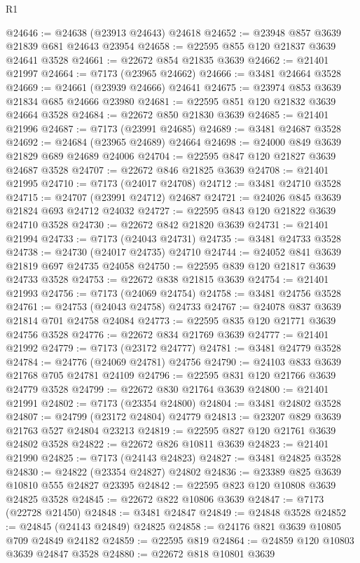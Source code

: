 \begin{lexlean}{R1}
\begin{coremodule}
@24646 := @24638 (@23913 @24643) @24618
@24652 := @23948 @857 @3639 @21839 @681 @24643 @23954
@24658 := @22595 @855 @120 @21837 @3639 @24641 @3528
@24661 := @22672 @854 @21835 @3639
@24662 := @21401 @21997
@24664 := @7173 (@23965 @24662)
@24666 := @3481 @24664 @3528
@24669 := @24661 (@23939 @24666) @24641
@24675 := @23974 @853 @3639 @21834 @685 @24666 @23980
@24681 := @22595 @851 @120 @21832 @3639 @24664 @3528
@24684 := @22672 @850 @21830 @3639
@24685 := @21401 @21996
@24687 := @7173 (@23991 @24685)
@24689 := @3481 @24687 @3528
@24692 := @24684 (@23965 @24689) @24664
@24698 := @24000 @849 @3639 @21829 @689 @24689 @24006
@24704 := @22595 @847 @120 @21827 @3639 @24687 @3528
@24707 := @22672 @846 @21825 @3639
@24708 := @21401 @21995
@24710 := @7173 (@24017 @24708)
@24712 := @3481 @24710 @3528
@24715 := @24707 (@23991 @24712) @24687
@24721 := @24026 @845 @3639 @21824 @693 @24712 @24032
@24727 := @22595 @843 @120 @21822 @3639 @24710 @3528
@24730 := @22672 @842 @21820 @3639
@24731 := @21401 @21994
@24733 := @7173 (@24043 @24731)
@24735 := @3481 @24733 @3528
@24738 := @24730 (@24017 @24735) @24710
@24744 := @24052 @841 @3639 @21819 @697 @24735 @24058
@24750 := @22595 @839 @120 @21817 @3639 @24733 @3528
@24753 := @22672 @838 @21815 @3639
@24754 := @21401 @21993
@24756 := @7173 (@24069 @24754)
@24758 := @3481 @24756 @3528
@24761 := @24753 (@24043 @24758) @24733
@24767 := @24078 @837 @3639 @21814 @701 @24758 @24084
@24773 := @22595 @835 @120 @21771 @3639 @24756 @3528
@24776 := @22672 @834 @21769 @3639
@24777 := @21401 @21992
@24779 := @7173 (@23172 @24777)
@24781 := @3481 @24779 @3528
@24784 := @24776 (@24069 @24781) @24756
@24790 := @24103 @833 @3639 @21768 @705 @24781 @24109
@24796 := @22595 @831 @120 @21766 @3639 @24779 @3528
@24799 := @22672 @830 @21764 @3639
@24800 := @21401 @21991
@24802 := @7173 (@23354 @24800)
@24804 := @3481 @24802 @3528
@24807 := @24799 (@23172 @24804) @24779
@24813 := @23207 @829 @3639 @21763 @527 @24804 @23213
@24819 := @22595 @827 @120 @21761 @3639 @24802 @3528
@24822 := @22672 @826 @10811 @3639
@24823 := @21401 @21990
@24825 := @7173 (@24143 @24823)
@24827 := @3481 @24825 @3528
@24830 := @24822 (@23354 @24827) @24802
@24836 := @23389 @825 @3639 @10810 @555 @24827 @23395
@24842 := @22595 @823 @120 @10808 @3639 @24825 @3528
@24845 := @22672 @822 @10806 @3639
@24847 := @7173 (@22728 @21450)
@24848 := @3481 @24847
@24849 := @24848 @3528
@24852 := @24845 (@24143 @24849) @24825
@24858 := @24176 @821 @3639 @10805 @709 @24849 @24182
@24859 := @22595 @819
@24864 := @24859 @120 @10803 @3639 @24847 @3528
@24880 := @22672
    @818
    @10801
    @3639

\end{coremodule}
\end{lexlean}
